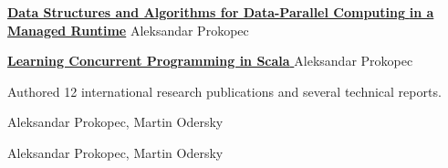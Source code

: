 \documentclass[9pt]{article}
\begin{document}



\medskip

\noindent\href{http://infoscience.epfl.ch/record/200977/files/EPFL_TH6264.pdf}
{\bf Data Structures and Algorithms for Data-Parallel Computing }
\newline
\noindent\href{http://infoscience.epfl.ch/record/200977/files/EPFL_TH6264.pdf}
{\bf in a Managed Runtime}
\newline
\noindent Aleksandar Prokopec
\bigskip


\medskip

\noindent\href{http://www.amazon.com/Learning-Concurrent-Programming-Aleksandar-Prokopec/dp/1783281413/}
{\bf Learning Concurrent Programming in Scala }
\newline
\noindent Aleksandar Prokopec
\bigskip




\noindent
Authored 12 international research publications
and several technical reports.
\newline


\noindent\href{http://axel22.github.io/resources/docs/reactive-isolates.pdf}
\newline{}
\dates{}
\newline\noindent Aleksandar Prokopec, Martin Odersky
\newline
{}
\medskip

\noindent\href{http://axel22.github.io/resources/docs/lcpc-conc-trees.pdf}
\newline\noindent Aleksandar Prokopec, Martin Odersky
\newline
{}
\medskip
\end{document}
